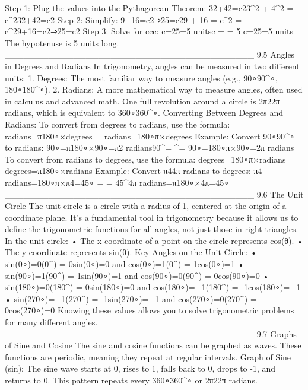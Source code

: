 Step 1: Plug the values into the Pythagorean Theorem:
32+42=c23^2 + 4^2 = c^232+42=c2
Step 2: Simplify:
9+16=c2⇒25=c29 + 16 = c^2 \quad \Rightarrow {} = c^29+16=c2⇒25=c2
Step 3: Solve for ccc:
c=25=5 unitsc =  = 5 c=25=5 units
The hypotenuse is 5 units long.
________________________________________
9.5 Angles in Degrees and Radians
In trigonometry, angles can be measured in two different units:
1.	Degrees: The most familiar way to measure angles (e.g., 90∘90^∘, 180∘180^∘).
2.	Radians: A more mathematical way to measure angles, often used in calculus and advanced math. One full revolution around a circle is 2π2\pi2π radians, which is equivalent to 360∘360^∘.
Converting Between Degrees and Radians:
To convert from degrees to radians, use the formula:
radians=π180∘×degrees =  \times {}radians=180∘π×degrees
Example:
Convert 90∘90^∘ to radians:
90∘=π180∘×90∘=π2 radians90^\circ =  ^\circ =  90∘=180∘π×90∘=2π radians
To convert from radians to degrees, use the formula:
degrees=180∘π×radians =  \times {}degrees=π180∘×radians
Example:
Convert π44π radians to degrees:
π4 radians=180∘π×π4=45∘  =  \times {} = 45^\circ4π radians=π180∘×4π=45∘
________________________________________
9.6 The Unit Circle
The unit circle is a circle with a radius of 1, centered at the origin of a coordinate plane. It’s a fundamental tool in trigonometry because it allows us to define the trigonometric functions for all angles, not just those in right triangles.
In the unit circle:
•	The x-coordinate of a point on the circle represents cos(θ).
•	The y-coordinate represents sin(θ).
Key Angles on the Unit Circle:
•	sin⁡(0∘)=0\sin(0^\circ) = 0sin(0∘)=0 and cos⁡(0∘)=1\cos(0^\circ) = 1cos(0∘)=1
•	sin⁡(90∘)=1\sin(90^\circ) = 1sin(90∘)=1 and cos⁡(90∘)=0\cos(90^\circ) = 0cos(90∘)=0
•	sin⁡(180∘)=0\sin(180^\circ) = 0sin(180∘)=0 and cos⁡(180∘)=−1\cos(180^\circ) = -1cos(180∘)=−1
•	sin⁡(270∘)=−1\sin(270^\circ) = -1sin(270∘)=−1 and cos⁡(270∘)=0\cos(270^\circ) = 0cos(270∘)=0
Knowing these values allows you to solve trigonometric problems for many different angles.
________________________________________
9.7 Graphs of Sine and Cosine
The sine and cosine functions can be graphed as waves. These functions are periodic, meaning they repeat at regular intervals.
Graph of Sine (sin):
The sine wave starts at 0, rises to 1, falls back to 0, drops to -1, and returns to 0. This pattern repeats every 360∘360^∘ or 2π2\pi2π radians.
